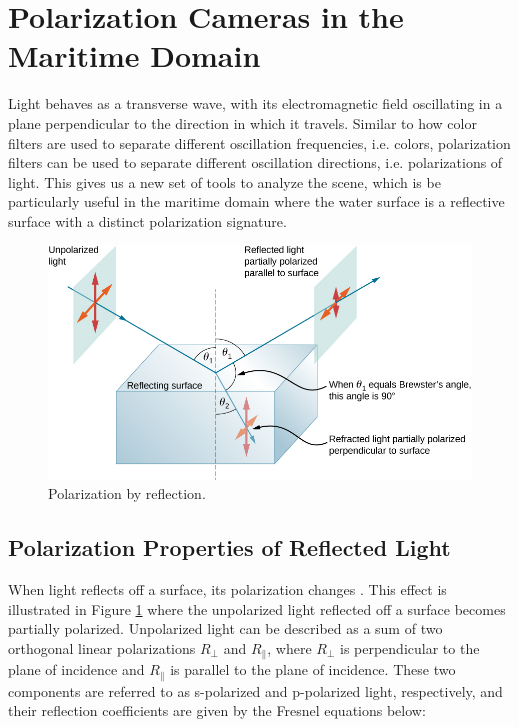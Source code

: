 \section{Polarization Cameras in the Maritime Domain}
Light behaves as a transverse wave, with its electromagnetic field oscillating in a plane perpendicular to the direction in which it travels.
Similar to how color filters are used to separate different oscillation frequencies, i.e. colors, polarization filters can be used to separate different oscillation directions, i.e. polarizations of light.
This gives us a new set of tools to analyze the scene, which is be particularly useful in the maritime domain where the water surface is a reflective surface with a distinct polarization signature.

\begin{figure}[H]
    \centering
    \includegraphics[width=.8\linewidth]{figures/polarization/reflaction.png}
    \caption{Polarization by reflection.
        \cite[Figure 1.38]{lingUniversityPhysicsVolume2016}}
    \label{fig:polarized_reflection}
\end{figure}

\subsection{Polarization Properties of Reflected Light}
When light reflects off a surface, its polarization changes \cite[34]{lingUniversityPhysicsVolume2016}.
This effect is illustrated in Figure \ref{fig:polarized_reflection} where the unpolarized light reflected off a surface becomes partially polarized.
Unpolarized light can be described as a sum of two orthogonal linear polarizations $R_\perp$ and $R_\parallel$, where $R_\perp$ is perpendicular to the plane of incidence and $R_\parallel$ is parallel to the plane of incidence.
These two components are referred to as s-polarized and p-polarized light, respectively, and their reflection coefficients are given by the Fresnel equations below:

